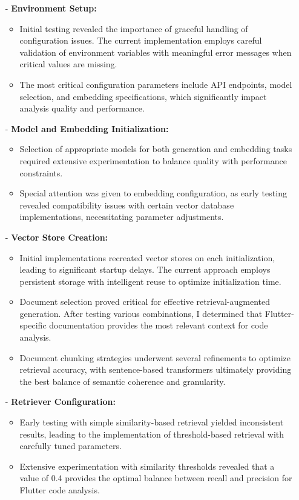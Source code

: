 \begin{itemize}
    \item[-] \textbf{Environment Setup:}
    \begin{itemize}
        \item Initial testing revealed the importance of graceful handling of configuration issues. The current implementation employs careful validation of environment variables with meaningful error messages when critical values are missing.
        \item The most critical configuration parameters include API endpoints, model selection, and embedding specifications, which significantly impact analysis quality and performance.
    \end{itemize}

    \item[-] \textbf{Model and Embedding Initialization:}
    \begin{itemize}
        \item Selection of appropriate models for both generation and embedding tasks required extensive experimentation to balance quality with performance constraints.
        \item Special attention was given to embedding configuration, as early testing revealed compatibility issues with certain vector database implementations, necessitating parameter adjustments.
    \end{itemize}

    \item[-] \textbf{Vector Store Creation:}
    \begin{itemize}
        \item Initial implementations recreated vector stores on each initialization, leading to significant startup delays. The current approach employs persistent storage with intelligent reuse to optimize initialization time.
        \item Document selection proved critical for effective retrieval-augmented generation. After testing various combinations, I determined that Flutter-specific documentation provides the most relevant context for code analysis.
        \item Document chunking strategies underwent several refinements to optimize retrieval accuracy, with sentence-based transformers ultimately providing the best balance of semantic coherence and granularity.
    \end{itemize}

    \item[-] \textbf{Retriever Configuration:}
    \begin{itemize}
        \item Early testing with simple similarity-based retrieval yielded inconsistent results, leading to the implementation of threshold-based retrieval with carefully tuned parameters.
        \item Extensive experimentation with similarity thresholds revealed that a value of 0.4 provides the optimal balance between recall and precision for Flutter code analysis.
    \end{itemize}


\end{itemize}
